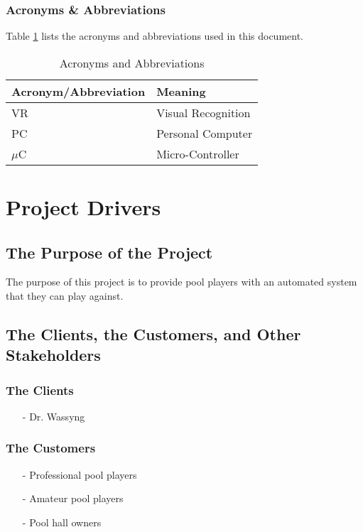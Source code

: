\documentclass[titlepage]{article}
\begin{document}
\subsubsection{Acronyms \& Abbreviations}
Table \ref{tab:Acronyms} lists the acronyms and abbreviations used in this document.
\begin{table}[h!]
\centering
\caption{Acronyms and Abbreviations}
\begin{tabular}{| p{6cm} | p{6cm} |}\hline
	\textbf{Acronym/Abbreviation}	&\textbf{Meaning}\\\hline
	VR								&Visual Recognition\\\hline
	PC								&Personal Computer\\\hline
	$\mu$C							&Micro-Controller\\\hline
\end{tabular}
\label{tab:Acronyms}
\end{table}


\section{Project Drivers}
\subsection{The Purpose of the Project}
The purpose of this project is to provide pool players with an automated system that they can play against.

\subsection{The Clients, the Customers, and Other Stakeholders}
\subsubsection{The Clients}
\begin{itemize}
	\item[-] Dr. Wassyng
\end{itemize}
\subsubsection{The Customers}
\begin{itemize}
	\item[-] Professional pool players
	\item[-] Amateur pool players
	\item[-] Pool hall owners
\end{itemize}
\end{document}

